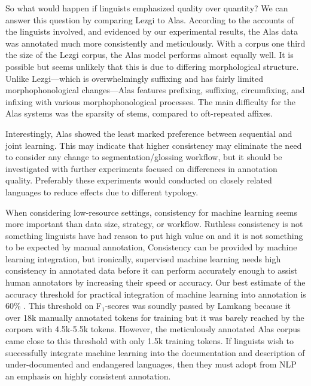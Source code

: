 So what would happen if linguists emphasized quality over quantity? We can answer this question by comparing Lezgi to Alas. According to the accounts of the linguists involved, and evidenced by our experimental results, the Alas data was annotated much more consistently and meticulously. With a corpus one third the size of the Lezgi corpus, the Alas model performs almost equally well. It is possible but seems unlikely that this is due to differing morphological structure. Unlike Lezgi---which is overwhelmingly suffixing and has fairly limited morphophonological changes---Alas features prefixing, suffixing, circumfixing, and infixing with various morphophonological processes. The main difficulty for the Alas systems was the sparsity of stems, compared to oft-repeated affixes. 

Interestingly, Alas showed the least marked preference between sequential and joint learning. This may indicate that higher consistency may eliminate the need to consider any change to segmentation/glossing workflow, but it should be investigated with further experiments focused on differences in annotation quality. Preferably these experiments would conducted on closely related languages to reduce effects due to different typology. 



When considering low-resource settings, consistency for machine learning seems more important than data size, strategy, or workflow. Ruthless consistency is not something linguists have had reason to put high value on and it is not something to be expected by manual annotation, %
Consistency can be provided by machine learning integration, but ironically, supervised machine learning needs high consistency in annotated data before it can perform accurately enough to assist human annotators by increasing their speed or accuracy. Our best estimate of the accuracy threshold for practical integration of machine learning into annotation is 60\% \citep{felt_improving_2012}. This threshold on F$_1$-scores was soundly passed by Lamkang because it over 18k manually annotated tokens for training but it was barely reached by the corpora with 4.5k-5.5k tokens. However, the meticulously annotated Alas corpus came close to this threshold with only 1.5k training tokens. If linguists wish to successfully integrate machine learning into the documentation and description of under-documented and endangered languages, then they must adopt from NLP an emphasis on highly consistent annotation.

